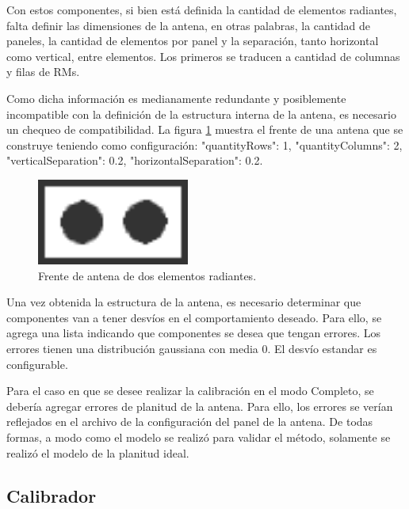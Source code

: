 Con estos componentes, si bien está definida la cantidad de elementos radiantes, falta definir las dimensiones de la antena, 
en otras palabras, la cantidad de paneles, la cantidad de elementos por panel y la separación, tanto horizontal como vertical,
entre elementos. Los primeros se traducen a cantidad de columnas y filas de RMs. 

Como dicha información es medianamente redundante y posiblemente incompatible con la definición de la estructura interna de 
la antena, es necesario un chequeo de compatibilidad. La figura \ref{fig:frontAntenna} muestra el frente de una antena que se 
construye teniendo como configuración: "quantityRows": 1, "quantityColumns": 2, "verticalSeparation": 0.2, 
"horizontalSeparation": 0.2.

\begin{figure}
 \centering
 \includegraphics[width=5cm]{gfx/FrontAntenna2.png}
 \caption{Frente de antena de dos elementos radiantes.}
 \label{fig:frontAntenna}
\end{figure}

Una vez obtenida la estructura de la antena, es necesario determinar que componentes van a tener desvíos en el comportamiento 
deseado. Para ello, se agrega una lista indicando que componentes se desea que tengan errores. Los errores tienen una 
distribución gaussiana con media 0. El desvío estandar es configurable.

Para el caso en que se desee realizar la calibración en el modo Completo, se debería agregar errores de planitud de la antena.
Para ello, los errores se verían reflejados en el archivo de la configuración del panel de la antena. De todas formas, a modo 
como el modelo se realizó para validar el método, solamente se realizó el modelo de la planitud ideal.




\subsection{Calibrador}

